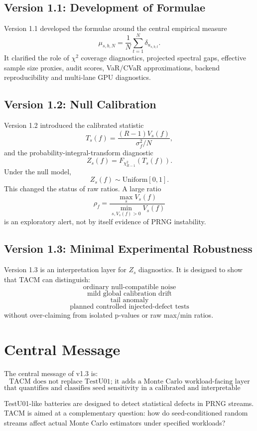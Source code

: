 \documentclass[11pt,a4paper]{article}
\newcommand{\Unif}{\mathrm{Uniform}}
\begin{document}
\subsection{Version 1.1: Development of Formulae}

Version 1.1 developed the formulae around the central empirical measure
\[
\mu_{s,b,N}
=
\frac1N
\sum_{t=1}^{N}
\delta_{u_{s,b,t}}.
\]
It clarified the role of $\chi^2$ coverage diagnostics, projected spectral gaps, effective sample size proxies, audit scores, VaR/CVaR approximations, backend reproducibility and multi-lane GPU diagnostics.

\subsection{Version 1.2: Null Calibration}

Version 1.2 introduced the calibrated statistic
\[
T_s(f)
=
\frac{(R-1)V_s(f)}
{\sigma_f^2/N},
\]
and the probability-integral-transform diagnostic
\[
Z_s(f)
=
F_{\chi^2_{R-1}}
\left(
T_s(f)
\right).
\]
Under the null model,
\[
Z_s(f)\sim \Unif[0,1].
\]
This changed the status of raw ratios. A large ratio
\[
\rho_f
=
\frac{\max_s V_s(f)}
{\min_{s,V_s(f)>0} V_s(f)}
\]
is an exploratory alert, not by itself evidence of PRNG instability.

\subsection{Version 1.3: Minimal Experimental Robustness}

Version 1.3 is an interpretation layer for $Z_s$ diagnostics. It is designed to show that TACM can distinguish:
\[
\boxed{\text{ordinary null-compatible noise}}
\]
\[
\boxed{\text{mild global calibration drift}}
\]
\[
\boxed{\text{tail anomaly}}
\]
\[
\boxed{\text{planned controlled injected-defect tests}}
\]
without over-claiming from isolated p-values or raw max/min ratios.

\section{Central Message}

The central message of v1.3 is:
\[
\boxed{
\text{TACM does not replace TestU01; it adds a Monte Carlo workload-facing layer}
}
\]
\[
\boxed{
\text{that quantifies and classifies seed sensitivity in a calibrated and interpretable way.}
}
\]

TestU01-like batteries are designed to detect statistical defects in PRNG streams. TACM is aimed at a complementary question: how do seed-conditioned random streams affect actual Monte Carlo estimators under specified workloads?
\end{document}
